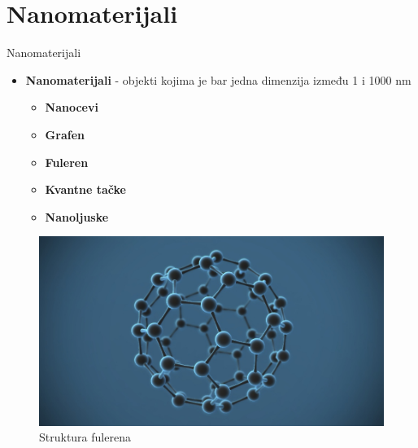 \documentclass{beamer}
\begin{document}
\section{Nanomaterijali}
\begin{frame}{Nanomaterijali}

\begin{itemize}
\item \textbf{Nanomaterijali} - objekti kojima je bar jedna dimenzija između 1 i 1000 nm
\begin{itemize}
\item \textbf{Nanocevi}
\item \textbf{Grafen}
\item \textbf{Fuleren}
\item \textbf{Kvantne tačke}
\item \textbf{Nanoljuske}
\end{itemize}
\end{itemize}

\begin{figure}[H]
\begin{center}
\includegraphics[scale=0.12]{slika 3.jpg}
\end{center}
\caption{Struktura fulerena}
\label{fig:slika_1}

\end{figure}
\end{frame}
\end{document}
